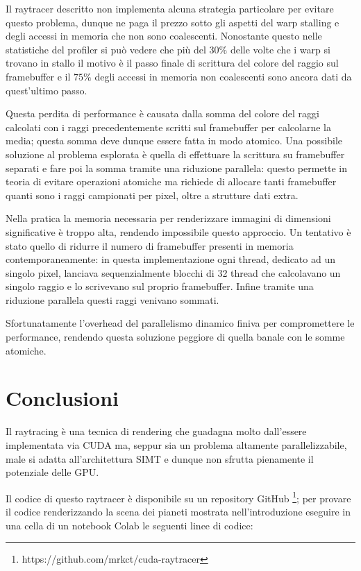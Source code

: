 \documentclass[12pt, twoside]{article}
\begin{document}
Il raytracer descritto non implementa alcuna strategia particolare per evitare
questo problema, dunque ne paga il prezzo sotto gli aspetti del warp stalling
e degli accessi in memoria che non sono coalescenti.
Nonostante questo nelle statistiche del profiler si può vedere che più del
$30\%$ delle volte che i warp si trovano in stallo il motivo è il passo finale
di scrittura del colore del raggio sul framebuffer e il $75\%$ degli
accessi in memoria non coalescenti sono ancora dati da quest'ultimo passo.

Questa perdita di performance è causata dalla somma del colore del raggi
calcolati con i raggi precedentemente scritti sul framebuffer per calcolarne
la media; questa somma deve dunque essere fatta in modo atomico.
Una possibile soluzione al problema esplorata è quella di effettuare la
scrittura su framebuffer separati e fare poi la somma tramite una riduzione
parallela: questo permette in teoria di evitare operazioni atomiche ma richiede
di allocare tanti framebuffer quanti sono i raggi campionati per pixel, oltre 
a strutture dati extra.

Nella pratica la memoria necessaria per renderizzare immagini di dimensioni
significative è troppo alta, rendendo impossibile questo approccio.
Un tentativo è stato quello di ridurre il numero di framebuffer presenti in
memoria contemporaneamente: in questa implementazione ogni thread, dedicato ad
un singolo pixel, lanciava sequenzialmente blocchi di 32 thread che calcolavano
un singolo raggio e lo scrivevano sul proprio framebuffer.
Infine tramite una riduzione parallela questi raggi venivano sommati.

Sfortunatamente l'overhead del parallelismo dinamico finiva per compromettere
le performance, rendendo questa soluzione peggiore di quella banale con le
somme atomiche.

\section{Conclusioni}
Il raytracing è una tecnica di rendering che guadagna molto dall'essere
implementata via CUDA ma, seppur sia un problema altamente parallelizzabile,
male si adatta all'architettura SIMT e dunque non sfrutta pienamente il
potenziale delle GPU.

Il codice di questo raytracer è disponibile su un repository GitHub
\footnote{https://github.com/mrkct/cuda-raytracer};
per provare il codice renderizzando la scena dei pianeti mostrata
nell'introduzione eseguire in una cella di un notebook Colab
le seguenti linee di codice:
\end{document}
